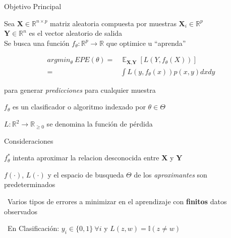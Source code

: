 \documentclass[xcolor=x11names]{beamer}
\DeclareMathOperator{\Expect}{\mathbb{E}}
\begin{document}
\begin{frame}{Objetivo Principal}
		\centering

		Sea $\textbf{X} \in \mathbb{R}^{n \times p}$ matriz aleatoria compuesta por muestras $\textbf{X}_i \in \mathbb{R}^{p}$\\
		$\textbf{Y} \in \mathbb{R}^n$ es el vector aleatorio de salida \\
		Se busca una función $f_\theta: \mathbb{R}^{p} \rightarrow  \mathbb{R}$ que optimice u ``aprenda''

	\begin{equation}%
		\begin{split}
		argmin_{\theta} \  EPE(\theta) = & \Expect_{\textbf{X},\textbf{Y}} \left[ L(Y,f_\theta(X))\right]  \\
			= & \int L(y,f_\theta (x)) p(x,y) dx dy
		\end{split}
	\end{equation}

	para generar \textit{predicciones} para cualquier muestra

	\smallskip
	$f_\theta$ es un clasificador o algoritmo indexado por $\theta \in \Theta$

	\smallskip
	$L: \mathbb{R}^{2} \rightarrow  \mathbb{R}_{\geq 0}$ se denomina la función de pérdida


\end{frame}

\begin{frame}{Consideraciones}

	$f_\theta^*$ intenta aproximar la relacion desconocida entre $\textbf{X}$ y $\textbf{Y}$

	\bigskip

	$f(\cdot)$, $L(\cdot)$ y el espacio de busqueda $\Theta$ de los \textit{aproximantes} son predeterminados

	\bigskip\
	Varios tipos de errores a minimizar en el aprendizaje con \textbf{finitos} datos observados

	\bigskip\
	En Clasificación: $y_i \in \{0,1\} \ \forall  i$ y $L(z,w) =  \mathbb{I}(z \neq w ) $

\end{frame}

\end{document}
